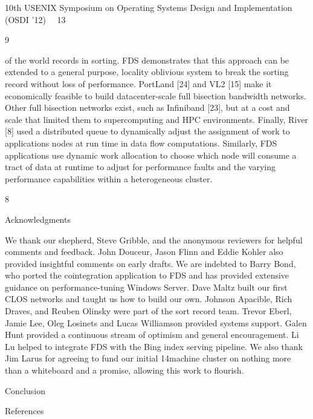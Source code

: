 10th USENIX Symposium on Operating Systems Design and Implementation (OSDI ’12)  13


9

of the world records in sorting. FDS demonstrates that
this approach can be extended to a general purpose, locality oblivious system to break the sorting record without loss of performance.
PortLand [24] and VL2 [15] make it economically feasible to build datacenter-scale full bisection bandwidth
networks. Other full bisection networks exist, such as
Infiniband [23], but at a cost and scale that limited them
to supercomputing and HPC environments.
Finally, River [8] used a distributed queue to dynamically adjust the assignment of work to applications nodes
at run time in data flow computations. Similarly, FDS applications use dynamic work allocation to choose which
node will consume a tract of data at runtime to adjust for
performance faults and the varying performance capabilities within a heterogeneous cluster.

8

Acknowledgments

We thank our shepherd, Steve Gribble, and the anonymous reviewers for helpful comments and feedback.
John Douceur, Jason Flinn and Eddie Kohler also provided insightful comments on early drafts. We are indebted to Barry Bond, who ported the cointegration application to FDS and has provided extensive guidance on
performance-tuning Windows Server. Dave Maltz built
our first CLOS networks and taught us how to build our
own. Johnson Apacible, Rich Draves, and Reuben Olinsky were part of the sort record team. Trevor Eberl, Jamie
Lee, Oleg Losinets and Lucas Williamson provided systems support. Galen Hunt provided a continuous stream
of optimism and general encouragement. Li Lu helped to
integrate FDS with the Bing index serving pipeline. We
also thank Jim Larus for agreeing to fund our initial 14machine cluster on nothing more than a whiteboard and
a promise, allowing this work to flourish.

Conclusion

References


